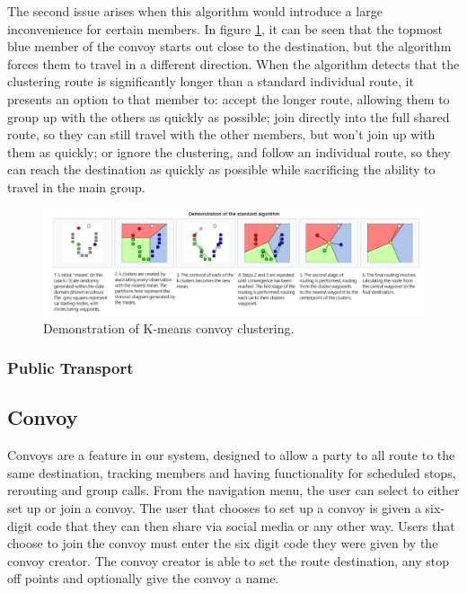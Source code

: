 \documentclass{article}
\begin{document}
The second issue arises when this algorithm would introduce a large inconvenience for certain members. In figure \ref{nav-kmeans}, it can be seen that the topmost blue member of the convoy starts out close to the destination, but the algorithm forces them to travel in a different direction. When the algorithm detects that the clustering route is significantly longer than a standard individual route, it presents an option to that member to: accept the longer route, allowing them to group up with the others as quickly as possible; join directly into the full shared route, so they can still travel with the other members, but won't join up with them as quickly; or ignore the clustering, and follow an individual route, so they can reach the destination as quickly as possible while sacrificing the ability to travel in the main group.

\begin{figure}[H]
  \centering
  \includegraphics[scale=0.5]{kmeanscluster}
  \caption{Demonstration of K-means convoy clustering.}\label{nav-kmeans}
\end{figure}

\subsubsection{Public Transport}


\subsection{Convoy}\label{ssec:nav-convoy} %
Convoys are a feature in our system, designed to allow a party to all route to the same destination, tracking members and having functionality for scheduled stops, rerouting and group calls. From the navigation menu, the user can select to either set up or join a convoy. The user that chooses to set up a convoy is given a six-digit code that they can then share via social media or any other way. Users that choose to join the convoy must enter the six digit code they were given by the convoy creator. The convoy creator is able to set the route destination, any stop off points and optionally give the convoy a name.
\end{document}
